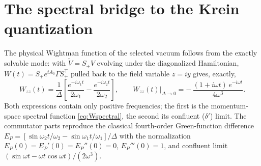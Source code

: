 \documentclass[11pt]{article}
\theoremstyle{definition}
\theoremstyle{remark}
\newcommand{\w}{\omega}
\begin{document}
\section{The spectral bridge to the Krein quantization}\label{sec:bridge}

The physical Wightman function of the selected vacuum follows from the
exactly solvable mode: with
$\widetilde V=S_+V$ evolving under the diagonalized Hamiltonian,
$W(t)=S_+e^{tA_0}\Gamma S_+^{\top}$ pulled back to the field variable
$z=iy$ gives, exactly,
\begin{equation}\label{eq:Wmode}
W_{zz}(t)
=\frac{1}{\Delta}
\left[\frac{e^{-i\w_1t}}{2\w_1}-\frac{e^{-i\w_2t}}{2\w_2}\right],
\qquad
W_{zz}(t)\Big|_{\Delta\to0}
=-\,\frac{(1+i\w t)\,e^{-i\w t}}{4\w^3}.
\end{equation}
Both expressions contain only positive frequencies; the first is the
momentum-space spectral function \eqref{eq:Wspectral}, the second its
confluent ($\delta'$) limit.  The commutator parts reproduce the classical
fourth-order Green-function difference
$E_P=[\sin\w_2t/\w_2-\sin\w_1t/\w_1]/\Delta$ with the normalization
$E_P(0)=E_P'(0)=E_P''(0)=0$, $E_P'''(0)=1$, and confluent limit
$(\sin\w t-\w t\cos\w t)/(2\w^3)$.
\end{document}

